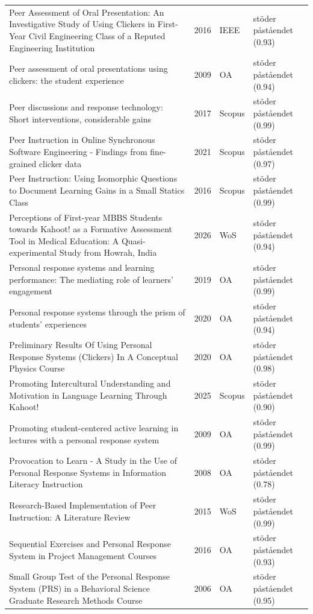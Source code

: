 \begin{longtable}{@{}%
  >{\raggedright\arraybackslash}p{}c%
  >{\raggedright\arraybackslash}p{}%
  >{\raggedright\arraybackslash}p{}@{}}
Peer Assessment of Oral Presentation: An Investigative Study of Using Clickers in First-Year Civil Engineering Class of a Reputed Engineering Institution & 2016 & IEEE & stöder påståendet (0.93) \\
Peer assessment of oral presentations using clickers: the student experience & 2009 & OA & stöder påståendet (0.94) \\
Peer discussions and response technology: Short interventions, considerable gains & 2017 & Scopus & stöder påståendet (0.99) \\
Peer Instruction in Online Synchronous Software Engineering - Findings from fine-grained clicker data & 2021 & Scopus & stöder påståendet (0.97) \\
Peer Instruction: Using Isomorphic Questions to Document Learning Gains in a Small Statics Class & 2016 & Scopus & stöder påståendet (0.99) \\
Perceptions of First-year MBBS Students towards Kahoot! as a Formative Assessment Tool in Medical Education: A Quasi-experimental Study from Howrah, India & 2026 & WoS & stöder påståendet (0.94) \\
Personal response systems and learning performance: The mediating role of learners' engagement & 2019 & OA & stöder påståendet (0.99) \\
Personal response systems through the prism of students' experiences & 2020 & OA & stöder påståendet (0.94) \\
Preliminary Results Of Using Personal Response Systems (Clickers) In A Conceptual Physics Course & 2020 & OA & stöder påståendet (0.98) \\
Promoting Intercultural Understanding and Motivation in Language Learning Through Kahoot! & 2025 & Scopus & stöder påståendet (0.90) \\
Promoting student-centered active learning in lectures with a personal response system & 2009 & OA & stöder påståendet (0.99) \\
Provocation to Learn - A Study in the Use of Personal Response Systems in Information Literacy Instruction & 2008 & OA & stöder påståendet (0.78) \\
Research-Based Implementation of Peer Instruction: A Literature Review & 2015 & WoS & stöder påståendet (0.99) \\
Sequential Exercises and Personal Response System in Project Management Courses & 2016 & OA & stöder påståendet (0.93) \\
Small Group Test of the Personal Response System (PRS) in a Behavioral Science Graduate Research Methods Course & 2006 & OA & stöder påståendet (0.95) \\

\end{longtable}
